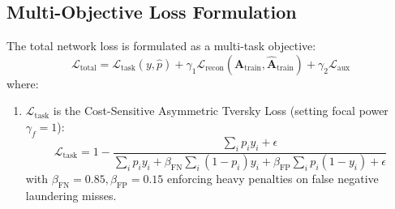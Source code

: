 \subsection{Multi-Objective Loss Formulation}
The total network loss is formulated as a multi-task objective:
\begin{equation}
\mathcal{L}_{\text{total}} = \mathcal{L}_{\text{task}}(y, \hat{p}) + \gamma_1 \mathcal{L}_{\text{recon}}(\mathbf{A}_{\text{train}}, \mathbf{\hat{A}}_{\text{train}}) + \gamma_2 \mathcal{L}_{\text{aux}}
\end{equation}
where:
\begin{enumerate}
    \item $\mathcal{L}_{\text{task}}$ is the Cost-Sensitive Asymmetric Tversky Loss (setting focal power $\gamma_f = 1$):
    \begin{equation}
    \mathcal{L}_{\text{task}} = 1 - \frac{\sum_i p_i y_i + \epsilon}{\sum_i p_i y_i + \beta_{\text{FN}} \sum_i (1 - p_i) y_i + \beta_{\text{FP}} \sum_i p_i (1 - y_i) + \epsilon}
    \end{equation}
    with $\beta_{\text{FN}} = 0.85, \beta_{\text{FP}} = 0.15$ enforcing heavy penalties on false negative laundering misses.


\end{enumerate}
